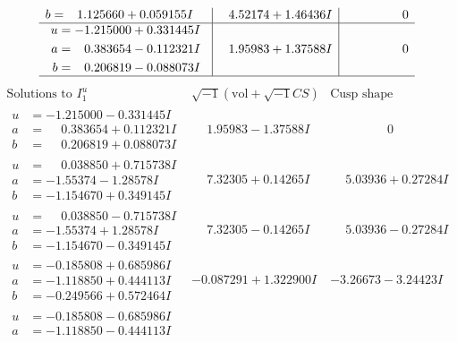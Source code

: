 \documentclass[1p]{elsarticle_modified}
\theoremstyle{definition}
\newcommand{\I}{\sqrt{-1}}
\begin{document}
$$\begin{array}{c|c|c}
\begin{aligned}
b &= \phantom{-}1.125660 + 0.059155 I\end{aligned}
 & \phantom{-}4.52174 + 1.46436 I & \phantom{-0.000000 } 0 \\ \hline\begin{aligned}
u &= -1.215000 + 0.331445 I \\
a &= \phantom{-}0.383654 - 0.112321 I \\
b &= \phantom{-}0.206819 - 0.088073 I\end{aligned}
 & \phantom{-}1.95983 + 1.37588 I & \phantom{-0.000000 } 0\\
 \hline 
 \end{array}$$\newpage$$\begin{array}{c|c|c}  
\text{Solutions to }I^u_{1}& \I (\text{vol} + \sqrt{-1}CS) & \text{Cusp shape}\\
 \hline 
\begin{aligned}
u &= -1.215000 - 0.331445 I \\
a &= \phantom{-}0.383654 + 0.112321 I \\
b &= \phantom{-}0.206819 + 0.088073 I\end{aligned}
 & \phantom{-}1.95983 - 1.37588 I & \phantom{-0.000000 } 0 \\ \hline\begin{aligned}
u &= \phantom{-}0.038850 + 0.715738 I \\
a &= -1.55374 - 1.28578 I \\
b &= -1.154670 + 0.349145 I\end{aligned}
 & \phantom{-}7.32305 + 0.14265 I & \phantom{-}5.03936 + 0.27284 I \\ \hline\begin{aligned}
u &= \phantom{-}0.038850 - 0.715738 I \\
a &= -1.55374 + 1.28578 I \\
b &= -1.154670 - 0.349145 I\end{aligned}
 & \phantom{-}7.32305 - 0.14265 I & \phantom{-}5.03936 - 0.27284 I \\ \hline\begin{aligned}
u &= -0.185808 + 0.685986 I \\
a &= -1.118850 + 0.444113 I \\
b &= -0.249566 + 0.572464 I\end{aligned}
 & -0.087291 + 1.322900 I & -3.26673 - 3.24423 I \\ \hline\begin{aligned}
u &= -0.185808 - 0.685986 I \\
a &= -1.118850 - 0.444113 I \\

\end{aligned}
\end{array}$$
\end{document}
